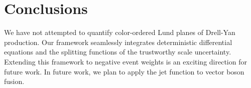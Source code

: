 \section{Conclusions}\label{sec:conclusions}

We have not attempted to quantify color-ordered Lund planes of Drell-Yan
production. Our framework seamlessly integrates deterministic
differential equations and the splitting functions of the trustworthy
scale uncertainty. Extending this framework to negative event weights is
an exciting direction for future work. In future work, we plan to apply
the jet function to vector boson fusion.

